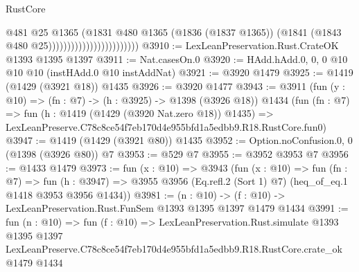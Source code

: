 \begin{lexlean}{RustCore}
\begin{coremodule}
                                              @481
                                              @25
                                              @1365
                                              (@1831
                                                @480
                                                @1365
                                                (@1836 (@1837 @1365))
                                                (@1841 (@1843 @480 @25))))))))))))))))))))))))
@3910 := LexLeanPreservation.Rust.CrateOK @1393 @1395 @1397
@3911 := Nat.casesOn.{0}
@3920 := HAdd.hAdd.{0, 0, 0} @10 @10 @10 (instHAdd.{0} @10 instAddNat)
@3921 := @3920 @1479
@3925 := @1419 (@1429 (@3921 @18)) @1435
@3926 := @3920 @1477
@3943 := @3911
    (fun (y : @10) => (fn : @7) -> (h : @3925) -> @1398 (@3926 @18))
    @1434
    (fun (fn : @7) =>
    fun (h : @1419 (@1429 (@3920 Nat.zero @18)) @1435) =>
    LexLeanPreserve.C78c8ce54f7eb170d4e955bfd1a5edbb9.R18.RustCore.fun0)
@3947 := @1419 (@1429 (@3921 @80)) @1435
@3952 := Option.noConfusion.{0, 0} (@1398 (@3926 @80)) @7
@3953 := @529 @7
@3955 := @3952 @3953 @7
@3956 := @1433 @1479
@3973 := fun (x : @10) =>
  @3943
    (fun (x : @10) =>
    fun (fn : @7) =>
    fun (h : @3947) =>
    @3955 @3956 (Eq.refl.{2} (Sort 1) @7) (heq_of_eq.{1} @1418 @3953 @3956 @1434))
@3981 := (n : @10) -> (f : @10) -> LexLeanPreservation.Rust.FunSem @1393 @1395 @1397 @1479 @1434
@3991 := fun (n : @10) =>
  fun (f : @10) =>
  LexLeanPreservation.Rust.simulate
    @1393
    @1395
    @1397
    LexLeanPreserve.C78c8ce54f7eb170d4e955bfd1a5edbb9.R18.RustCore.crate_ok
    @1479
    @1434
\end{coremodule}
\end{lexlean}
